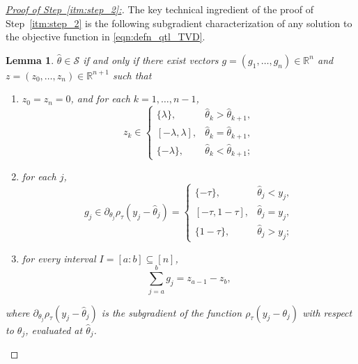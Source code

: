 \documentclass[11pt]{article}
\newcommand{\R}{\mathbb{R}}
\newcommand{\cS}{\mathcal{S}}
\theoremstyle{plain}
\newtheorem{lemma}[theorem]{Lemma}
\theoremstyle{definition}
\theoremstyle{remark}
\begin{document}
\begin{proof}[\underline{Proof of Step~\ref{itm:step_2}:}]
The key technical ingredient of the proof of Step~\ref{itm:step_2} is the following subgradient characterization of any solution to the objective function in \eqref{eqn:defn_qtl_TVD}.
\begin{lemma}\label{lem:qtvd-interval}
$\hat{\theta}\in \cS$ if and only if there exist vectors $g=(g_1,\dots,g_n)\in\R^n$ and $z=(z_0,\dots,z_n)\in\R^{n+1}$ such that
\begin{enumerate}
\item $z_0=z_n=0$, and for each $k=1,\dots,n-1$,
\[
z_k\in
\begin{cases}
\{\lambda\}, & \hat\theta_k>\hat\theta_{k+1},\\
[-\lambda,\lambda], & \hat\theta_k=\hat\theta_{k+1},\\
\{-\lambda\}, & \hat\theta_k<\hat\theta_{k+1};
\end{cases}
\]
\item for each $j$,
\[
g_j \in
\partial_{\theta_j}\rho_\tau(y_j-\hat\theta_j)=
\begin{cases}
\{-\tau\}, & \hat\theta_j<y_j,\\
[-\tau,1-\tau], & \hat\theta_j=y_j,\\
\{1-\tau\}, & \hat\theta_j>y_j;
\end{cases}
\]
\item for every interval $I=[a:b]\subseteq[n]$,
\begin{equation}\label{eq:interval-id-qtvd}
\sum_{j=a}^b g_j = z_{a-1}-z_b,
\end{equation}
\end{enumerate}
where $\partial_{\theta_j} \rho_{\tau}(y_j-\hat{\theta}_j)$ is the subgradient of the function $\rho_{\tau}(y_j-\theta_j)$ with respect to $\theta_j$, evaluated at $\hat{\theta}_j$.
\end{lemma}


\end{proof}
\end{document}
